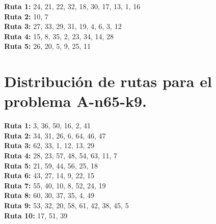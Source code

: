 \documentclass[a4paper,10pt,twocolumn]{article}
\begin{document}
	\hspace{-10pt}\textbf{Ruta 1:} 24, 21, 22, 32, 18, 30, 17, 13, 1, 16	\\
	\textbf{Ruta 2:} 10, 7	\\
	\textbf{Ruta 3:} 27, 33, 29, 31, 19, 4, 6, 3, 12	\\
	\textbf{Ruta 4:} 15, 8, 35, 2, 23, 34, 14, 28	\\
	\textbf{Ruta 5:} 26, 20, 5, 9, 25, 11 \\
	
	
	\section*{Distribución de rutas para el problema A-n65-k9.}
	\label{tab:result65_9}
	
	\hspace{-10pt}\textbf{Ruta 1:} 3, 36, 50, 16, 2, 41 \\
	\textbf{Ruta 2:} 34, 31, 26, 6, 64, 46, 47 \\
	\textbf{Ruta 3:} 62, 33, 1, 12, 13, 29 \\
	\textbf{Ruta 4:} 28, 23, 57, 48, 54, 63, 11, 7 \\
	\textbf{Ruta 5:} 21, 59, 44, 56, 25, 18 \\
	\textbf{Ruta 6:} 43, 27, 14, 9, 22, 15 \\
	\textbf{Ruta 7:} 55, 40, 10, 8, 52, 24, 19 \\
	\textbf{Ruta 8:} 60, 30, 37, 35, 4, 49 \\
	\textbf{Ruta 9:} 53, 32, 20, 58, 61, 42, 38, 45, 5 \\
	\textbf{Ruta 10:} 17, 51, 39\\ 
	
\end{document}
